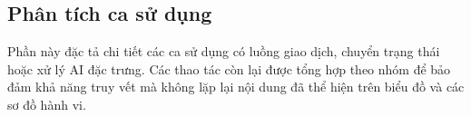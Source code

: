 
\subsection{Phân tích ca sử dụng}

Phần này đặc tả chi tiết các ca sử dụng có luồng giao dịch, chuyển trạng thái hoặc xử lý AI đặc trưng. Các thao tác còn lại được tổng hợp theo nhóm để bảo đảm khả năng truy vết mà không lặp lại nội dung đã thể hiện trên biểu đồ và các sơ đồ hành vi.

\newcommand{\UseCaseSpecification}[7]{%
    \begin{table}[!htbp]
        \centering
        \caption{Đặc tả #1 -- #2}
        \begin{tabularx}{\textwidth}{|p{0.25\textwidth}|X|}
            \hline
            \textbf{Tác nhân} & #3 \\ \hline
            \textbf{Tiền điều kiện và kích hoạt} & #4 \\ \hline
            \textbf{Luồng chính} & #5 \\ \hline
            \textbf{Luồng thay thế/ngoại lệ} & #6 \\ \hline
            \textbf{Hậu điều kiện} & #7 \\ \hline
        \end{tabularx}
    \end{table}
}

